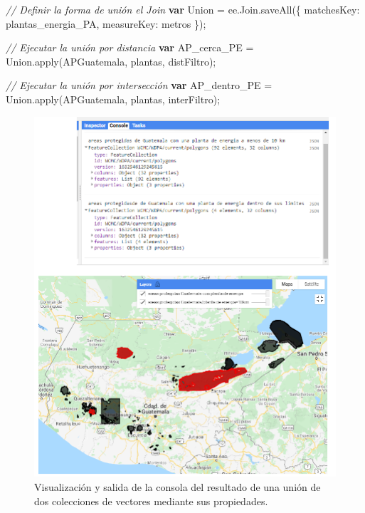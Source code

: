 \documentclass[
  12pt,
  letterpaper,
  twoside]{book}
\newenvironment{Shaded}{\begin{snugshade}}{\end{snugshade}}
\newcommand{\AttributeTok}[1]{\textcolor[rgb]{0.48,0.12,0.64}{#1}}
\newcommand{\CommentTok}[1]{\textcolor[rgb]{0.24,0.58,0.00}{\textit{#1}}}
\newcommand{\ControlFlowTok}[1]{\textcolor[rgb]{0.00,0.00,0.00}{\textbf{#1}}}
\newcommand{\DataTypeTok}[1]{\textcolor[rgb]{0.00,0.00,0.00}{#1}}
\newcommand{\FunctionTok}[1]{\textcolor[rgb]{0.48,0.12,0.64}{#1}}
\newcommand{\KeywordTok}[1]{\textcolor[rgb]{0.48,0.12,0.64}{#1}}
\newcommand{\NormalTok}[1]{#1}
\newcommand{\OperatorTok}[1]{\textcolor[rgb]{0.00,0.00,0.00}{#1}}
\newcommand{\StringTok}[1]{\textcolor[rgb]{0.87,0.29,0.22}{#1}}
\begin{document}
\begin{Shaded}
\begin{Highlighting}[]
\CommentTok{// Definir la forma de unión el Join}
\ControlFlowTok{var}\NormalTok{ Union }\OperatorTok{=} \KeywordTok{ee}\OperatorTok{.}\AttributeTok{Join}\OperatorTok{.}\FunctionTok{saveAll}\NormalTok{(\{}
  \DataTypeTok{matchesKey}\OperatorTok{:} \StringTok{\textquotesingle{}plantas\_energia\_PA\textquotesingle{}}\OperatorTok{,}
  \DataTypeTok{measureKey}\OperatorTok{:} \StringTok{\textquotesingle{}metros\textquotesingle{}}
\NormalTok{\})}\OperatorTok{;}

\CommentTok{// Ejecutar la unión por distancia}
\ControlFlowTok{var}\NormalTok{ AP\_cerca\_PE }\OperatorTok{=}\NormalTok{ Union}\OperatorTok{.}\FunctionTok{apply}\NormalTok{(APGuatemala}\OperatorTok{,}\NormalTok{ plantas}\OperatorTok{,}\NormalTok{ distFiltro)}\OperatorTok{;}

\CommentTok{// Ejecutar la unión por intersección}
\ControlFlowTok{var}\NormalTok{ AP\_dentro\_PE }\OperatorTok{=}\NormalTok{ Union}\OperatorTok{.}\FunctionTok{apply}\NormalTok{(APGuatemala}\OperatorTok{,}\NormalTok{ plantas}\OperatorTok{,}\NormalTok{ interFiltro)}\OperatorTok{;}
\end{Highlighting}
\end{Shaded}

\begin{figure}[H]

{\centering \includegraphics[width=0.95\linewidth]{Img/ej25} 

}

\caption{Visualización y salida de la consola del resultado de una unión de dos colecciones de vectores mediante sus propiedades.}\label{fig:f813}
\end{figure}
\end{document}
